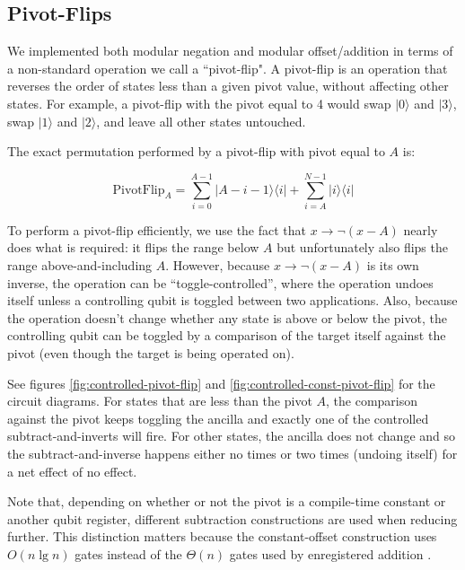 \documentclass[twocolumn]{article}
\begin{document}
\subsection{Pivot-Flips} \label{sec:pivot-flips}

We implemented both modular negation and modular offset/addition in terms of a non-standard operation we call a ``pivot-flip".
A pivot-flip is an operation that reverses the order of states less than a given pivot value, without affecting other states.
For example, a pivot-flip with the pivot equal to 4 would swap $|0\rangle$ and $|3\rangle$, swap $|1\rangle$ and $|2\rangle$, and leave all other states untouched.

The exact permutation performed by a pivot-flip with pivot equal to $A$ is:

$$\text{PivotFlip}_A = \sum_{i=0}^{A-1} |A-i-1\rangle \langle i| + \sum_{i=A}^{N-1} |i\rangle \langle i|$$

To perform a pivot-flip efficiently, we use the fact that $x \rightarrow \lnot(x - A)$ nearly does what is required: it flips the range below $A$ but unfortunately also flips the range above-and-including $A$.
However, because $x \rightarrow \lnot(x - A)$ is its own inverse, the operation can be ``toggle-controlled'', where the operation undoes itself unless a controlling qubit is toggled between two applications.
Also, because the operation doesn't change whether any state is above or below the pivot, the controlling qubit can be toggled by a comparison of the target itself against the pivot (even though the target is being operated on).

See figures \ref{fig:controlled-pivot-flip} and \ref{fig:controlled-const-pivot-flip} for the circuit diagrams.
For states that are less than the pivot $A$, the comparison against the pivot keeps toggling the ancilla and exactly one of the controlled subtract-and-inverts will fire.
For other states, the ancilla does not change and so the subtract-and-inverse happens either no times or two times (undoing itself) for a net effect of no effect.

Note that, depending on whether or not the pivot is a compile-time constant or another qubit register, different subtraction constructions are used when reducing further.
This distinction matters because the constant-offset construction uses $O(n \lg n)$ gates \cite{haner2016} instead of the $\Theta(n)$ gates used by enregistered addition \cite{takahashi2005}.
\end{document}
